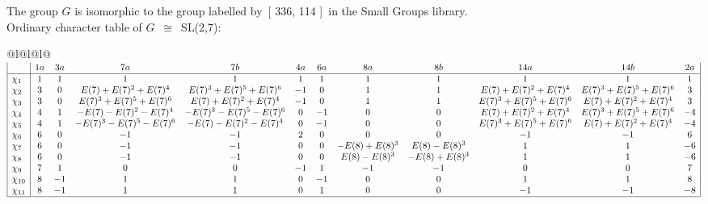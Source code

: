 \documentclass[varwidth=\maxdimen,border=10]{standalone}
\begin{document}
The group $G$ is isomorphic to the group labelled by\ [ 336, 114 ]\ in the Small Groups library.\\
Ordinary character table of $G$\ $\cong$\ SL(2,7):\\
\begin{center}
\begin{tabular}{@{}l@{}l@{}l@{}}
\hline
\(\begin{array}{|l|ccccccccccc|}
  & 1a & 3a & 7a & 7b & 4a & 6a & 8a & 8b & 14a & 14b & 2a\\ \hline
\chi_{1} & 1 & 1 & 1 & 1 & 1 & 1 & 1 & 1 & 1 & 1 & 1\\
\chi_{2} & 3 & 0 & E(7)+E(7)^{2}+E(7)^{4} & E(7)^{3}+E(7)^{5}+E(7)^{6} & -1 & 0 & 1 & 1 & E(7)+E(7)^{2}+E(7)^{4} & E(7)^{3}+E(7)^{5}+E(7)^{6} & 3\\
\chi_{3} & 3 & 0 & E(7)^{3}+E(7)^{5}+E(7)^{6} & E(7)+E(7)^{2}+E(7)^{4} & -1 & 0 & 1 & 1 & E(7)^{3}+E(7)^{5}+E(7)^{6} & E(7)+E(7)^{2}+E(7)^{4} & 3\\
\chi_{4} & 4 & 1 & -E(7)-E(7)^{2}-E(7)^{4} & -E(7)^{3}-E(7)^{5}-E(7)^{6} & 0 & -1 & 0 & 0 & E(7)+E(7)^{2}+E(7)^{4} & E(7)^{3}+E(7)^{5}+E(7)^{6} & -4\\
\chi_{5} & 4 & 1 & -E(7)^{3}-E(7)^{5}-E(7)^{6} & -E(7)-E(7)^{2}-E(7)^{4} & 0 & -1 & 0 & 0 & E(7)^{3}+E(7)^{5}+E(7)^{6} & E(7)+E(7)^{2}+E(7)^{4} & -4\\
\chi_{6} & 6 & 0 & -1 & -1 & 2 & 0 & 0 & 0 & -1 & -1 & 6\\
\chi_{7} & 6 & 0 & -1 & -1 & 0 & 0 & -E(8)+E(8)^{3} & E(8)-E(8)^{3} & 1 & 1 & -6\\
\chi_{8} & 6 & 0 & -1 & -1 & 0 & 0 & E(8)-E(8)^{3} & -E(8)+E(8)^{3} & 1 & 1 & -6\\
\chi_{9} & 7 & 1 & 0 & 0 & -1 & 1 & -1 & -1 & 0 & 0 & 7\\
\chi_{10} & 8 & -1 & 1 & 1 & 0 & -1 & 0 & 0 & 1 & 1 & 8\\
\chi_{11} & 8 & -1 & 1 & 1 & 0 & 1 & 0 & 0 & -1 & -1 & -8\\
\hline
\end{array}\)\\
\end{tabular}
\end{center}
\end{document}
